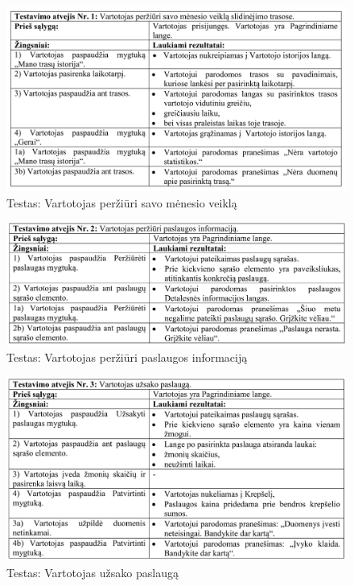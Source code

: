 \documentclass[oneside]{VUMIFPSkursinis}
\begin{document}
			\begin{figure}[h]
    				\centering
    				\includegraphics[width=1\textwidth]{test1.png}
    				\caption{Testas: Vartotojas peržiūri savo mėnesio veiklą}
    				\label{fig:Testas: Vartotojas peržiūri savo mėnesio veiklą}
			\end{figure}
			
			\begin{figure}[h]
    				\centering
    				\includegraphics[width=1\textwidth]{test2.png}
    				\caption{Testas: Vartotojas peržiūri paslaugos informaciją}
    				\label{fig:Testas: Vartotojas peržiūri paslaugos informaciją}
			\end{figure}
			
			\begin{figure}[h]
    				\centering
    				\includegraphics[width=1\textwidth]{test3.png}
    				\caption{Testas: Vartotojas užsako paslaugą}
    				\label{fig:Testas: Vartotojas užsako paslaugą}
			\end{figure}
			
\end{document}
